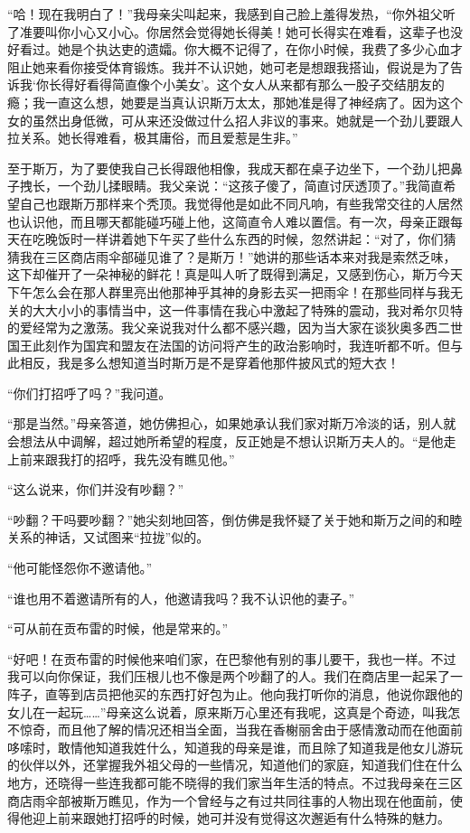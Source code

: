 \par “哈！现在我明白了！”我母亲尖叫起来，我感到自己脸上羞得发热，“你外祖父听了准要叫你小心又小心。你居然会觉得她长得美！她可长得实在难看，这辈子也没好看过。她是个执达吏的遗孀。你大概不记得了，在你小时候，我费了多少心血才阻止她来看你接受体育锻炼。我并不认识她，她可老是想跟我搭讪，假说是为了告诉我‘你长得好看得简直像个小美女’。这个女人从来都有那么一股子交结朋友的瘾；我一直这么想，她要是当真认识斯万太太，那她准是得了神经病了。因为这个女的虽然出身低微，可从来还没做过什么招人非议的事来。她就是一个劲儿要跟人拉关系。她长得难看，极其庸俗，而且爱惹是生非。”
\par 至于斯万，为了要使我自己长得跟他相像，我成天都在桌子边坐下，一个劲儿把鼻子拽长，一个劲儿揉眼睛。我父亲说：“这孩子傻了，简直讨厌透顶了。”我简直希望自己也跟斯万那样来个秃顶。我觉得他是如此不同凡响，有些我常交往的人居然也认识他，而且哪天都能碰巧碰上他，这简直令人难以置信。有一次，母亲正跟每天在吃晚饭时一样讲着她下午买了些什么东西的时候，忽然讲起：“对了，你们猜猜我在三区商店雨伞部碰见谁了？是斯万！”她讲的那些话本来对我是索然乏味，这下却催开了一朵神秘的鲜花！真是叫人听了既得到满足，又感到伤心，斯万今天下午怎么会在那人群里亮出他那神乎其神的身影去买一把雨伞！在那些同样与我无关的大大小小的事情当中，这一件事情在我心中激起了特殊的震动，我对希尔贝特的爱经常为之激荡。我父亲说我对什么都不感兴趣，因为当大家在谈狄奥多西二世国王此刻作为国宾和盟友在法国的访问将产生的政治影响时，我连听都不听。但与此相反，我是多么想知道当时斯万是不是穿着他那件披风式的短大衣！
\par “你们打招呼了吗？”我问道。
\par “那是当然。”母亲答道，她仿佛担心，如果她承认我们家对斯万冷淡的话，别人就会想法从中调解，超过她所希望的程度，反正她是不想认识斯万夫人的。“是他走上前来跟我打的招呼，我先没有瞧见他。”
\par “这么说来，你们并没有吵翻？”
\par “吵翻？干吗要吵翻？”她尖刻地回答，倒仿佛是我怀疑了关于她和斯万之间的和睦关系的神话，又试图来“拉拢”似的。
\par “他可能怪怨你不邀请他。”
\par “谁也用不着邀请所有的人，他邀请我吗？我不认识他的妻子。”
\par “可从前在贡布雷的时候，他是常来的。”
\par “好吧！在贡布雷的时候他来咱们家，在巴黎他有别的事儿要干，我也一样。不过我可以向你保证，我们压根儿也不像是两个吵翻了的人。我们在商店里一起呆了一阵子，直等到店员把他买的东西打好包为止。他向我打听你的消息，他说你跟他的女儿在一起玩……”母亲这么说着，原来斯万心里还有我呢，这真是个奇迹，叫我怎不惊奇，而且他了解的情况还相当全面，当我在香榭丽舍由于感情激动而在他面前哆嗦时，敢情他知道我姓什么，知道我的母亲是谁，而且除了知道我是他女儿游玩的伙伴以外，还掌握我外祖父母的一些情况，知道他们的家庭，知道我们住在什么地方，还晓得一些连我都可能不晓得的我们家当年生活的特点。不过我母亲在三区商店雨伞部被斯万瞧见，作为一个曾经与之有过共同往事的人物出现在他面前，使得他迎上前来跟她打招呼的时候，她可并没有觉得这次邂逅有什么特殊的魅力。
